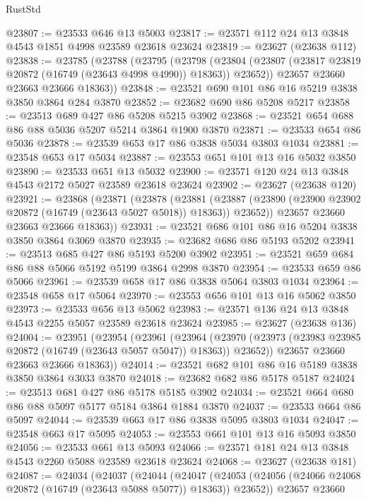 \begin{lexlean}{RustStd}
\begin{coremodule}
@23807 := @23533 @646 @13 @5003
@23817 := @23571 @112 @24 @13 @3848 @4543 @1851 @4998 @23589 @23618 @23624
@23819 := @23627 (@23638 @112)
@23838 := @23785
    (@23788
      (@23795
        (@23798
          (@23804 (@23807 (@23817 @23819 @20872 (@16749 (@23643 @4998 @4990)) @18363)) @23652))
        @23657
        @23660
        @23663
        @23666
        @18363))
@23848 := @23521 @690 @101 @86 @16 @5219 @3838 @3850 @3864 @284 @3870
@23852 := @23682 @690 @86 @5208 @5217
@23858 := @23513 @689 @427 @86 @5208 @5215 @3902
@23868 := @23521 @654 @688 @86 @88 @5036 @5207 @5214 @3864 @1900 @3870
@23871 := @23533 @654 @86 @5036
@23878 := @23539 @653 @17 @86 @3838 @5034 @3803 @1034
@23881 := @23548 @653 @17 @5034
@23887 := @23553 @651 @101 @13 @16 @5032 @3850
@23890 := @23533 @651 @13 @5032
@23900 := @23571 @120 @24 @13 @3848 @4543 @2172 @5027 @23589 @23618 @23624
@23902 := @23627 (@23638 @120)
@23921 := @23868
    (@23871
      (@23878
        (@23881
          (@23887 (@23890 (@23900 @23902 @20872 (@16749 (@23643 @5027 @5018)) @18363)) @23652))
        @23657
        @23660
        @23663
        @23666
        @18363))
@23931 := @23521 @686 @101 @86 @16 @5204 @3838 @3850 @3864 @3069 @3870
@23935 := @23682 @686 @86 @5193 @5202
@23941 := @23513 @685 @427 @86 @5193 @5200 @3902
@23951 := @23521 @659 @684 @86 @88 @5066 @5192 @5199 @3864 @2998 @3870
@23954 := @23533 @659 @86 @5066
@23961 := @23539 @658 @17 @86 @3838 @5064 @3803 @1034
@23964 := @23548 @658 @17 @5064
@23970 := @23553 @656 @101 @13 @16 @5062 @3850
@23973 := @23533 @656 @13 @5062
@23983 := @23571 @136 @24 @13 @3848 @4543 @2255 @5057 @23589 @23618 @23624
@23985 := @23627 (@23638 @136)
@24004 := @23951
    (@23954
      (@23961
        (@23964
          (@23970 (@23973 (@23983 @23985 @20872 (@16749 (@23643 @5057 @5047)) @18363)) @23652))
        @23657
        @23660
        @23663
        @23666
        @18363))
@24014 := @23521 @682 @101 @86 @16 @5189 @3838 @3850 @3864 @3033 @3870
@24018 := @23682 @682 @86 @5178 @5187
@24024 := @23513 @681 @427 @86 @5178 @5185 @3902
@24034 := @23521 @664 @680 @86 @88 @5097 @5177 @5184 @3864 @1884 @3870
@24037 := @23533 @664 @86 @5097
@24044 := @23539 @663 @17 @86 @3838 @5095 @3803 @1034
@24047 := @23548 @663 @17 @5095
@24053 := @23553 @661 @101 @13 @16 @5093 @3850
@24056 := @23533 @661 @13 @5093
@24066 := @23571 @181 @24 @13 @3848 @4543 @2260 @5088 @23589 @23618 @23624
@24068 := @23627 (@23638 @181)
@24087 := @24034
    (@24037
      (@24044
        (@24047
          (@24053 (@24056 (@24066 @24068 @20872 (@16749 (@23643 @5088 @5077)) @18363)) @23652))
        @23657
        @23660

\end{coremodule}
\end{lexlean}
